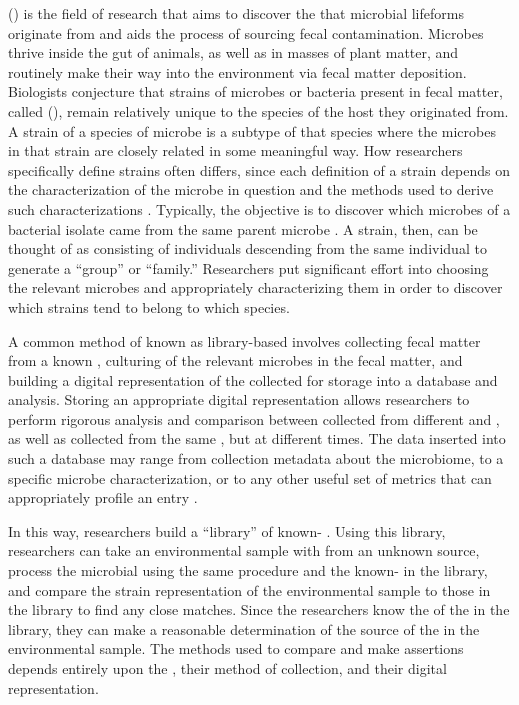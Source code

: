 \MSTlong{} (\mst{}) is the field of research that aims to discover the \spec{} that microbial lifeforms originate from
and
aids the process of sourcing fecal contamination. 
Microbes thrive inside the gut of animals, as well as in masses of plant matter, and routinely make their way into the environment via fecal matter deposition.
Biologists conjecture that strains of microbes or bacteria present in fecal matter, called \fiblong{} (\fib{}), remain relatively unique to the species of the host they originated from.
A strain of a species of microbe is a subtype of that species where the microbes in that strain are closely related in some meaningful way.
How researchers specifically define strains often differs, since each definition of a strain depends on the characterization of the microbe in question and the methods used to derive such characterizations \cite{simpson2002microbial}.
Typically, the objective is to discover which microbes of a bacterial isolate came from the same parent microbe \cite{Li892}.
A strain, then, can be thought of as consisting of individuals descending from the same individual to generate a ``group'' or ``family.''
Researchers put significant effort into choosing the relevant microbes and appropriately characterizing them in order to discover which strains tend to belong to which species.

A common method of \mst{} known as library-based \mst{} involves collecting fecal matter from a known \spec{}, culturing \isols{} of the relevant microbes in the fecal matter, and building a digital representation of the collected \isols{} for storage into a database and analysis.
Storing an appropriate digital representation allows researchers to perform rigorous analysis and comparison between \fib{} \isols{} collected from different \hosts{} and \spec{}, as well as \isols{} collected from the same \host{}, but at different times.
The data inserted into such a database may range from collection metadata about the microbiome, to a specific microbe characterization, or to any other useful set of metrics that can appropriately profile an entry \cite{ritter2003assessment}.

In this way, researchers build a ``library'' of known-\spec{} \isols{}.
Using this library, researchers can take an environmental sample with \fib{} from an unknown source, process the microbial \isols{} using the same procedure and the known-\spec{} \isols{} in the library, and compare the strain representation of the environmental sample to those in the library to find any close matches.
Since the researchers know the \spec{} of the \isols{} in the library, they can make a reasonable determination of the source of the \isols{} in the environmental sample.
The methods used to compare \isols{} and make assertions depends entirely upon the \fib{}, their method of collection, and their digital representation.

